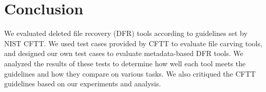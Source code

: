 \section{Conclusion}\label{conclusion} 

We evaluated deleted file recovery (DFR) tools according to guidelines set by NIST CFTT.
We used test cases provided by CFTT to evaluate file carving tools, and designed our own test cases to evaluate metadata-based DFR tools.
We analyzed the results of these tests to determine how well each tool meets the guidelines and how they compare on various tasks.
We also critiqued the CFTT guidelines based on our experiments and analysis.
